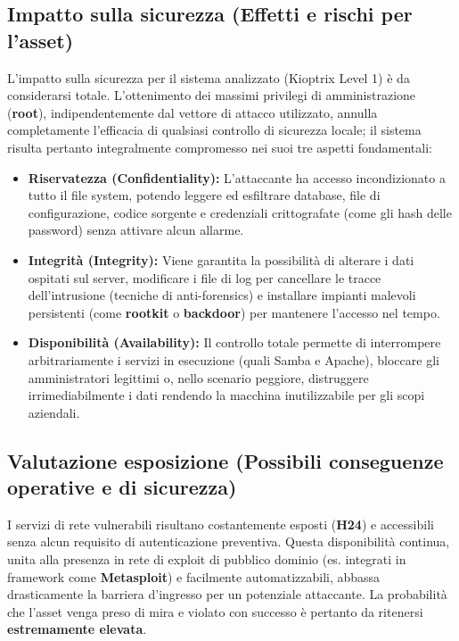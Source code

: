\documentclass[12pt, a4paper]{article}
\begin{document}
	\subsection{Impatto sulla sicurezza (Effetti e rischi per l'asset)}
	L'impatto sulla sicurezza per il sistema analizzato (Kioptrix Level 1) è da considerarsi totale. L'ottenimento dei massimi privilegi di amministrazione (\textbf{root}), indipendentemente dal vettore di attacco utilizzato, annulla completamente l'efficacia di qualsiasi controllo di sicurezza locale; il sistema risulta pertanto integralmente compromesso nei suoi tre aspetti fondamentali:
	\begin{itemize}
		\item \textbf{Riservatezza (Confidentiality):} L'attaccante ha accesso incondizionato a tutto il file system, potendo leggere ed esfiltrare database, file di configurazione, codice sorgente e credenziali crittografate (come gli hash delle password) senza attivare alcun allarme.
		\item \textbf{Integrità (Integrity):} Viene garantita la possibilità di alterare i dati ospitati sul server, modificare i file di log per cancellare le tracce dell'intrusione (tecniche di anti-forensics) e installare impianti malevoli persistenti (come \textbf{rootkit} o \textbf{backdoor}) per mantenere l'accesso nel tempo.
		\item \textbf{Disponibilità (Availability):} Il controllo totale permette di interrompere arbitrariamente i servizi in esecuzione (quali Samba e Apache), bloccare gli amministratori legittimi o, nello scenario peggiore, distruggere irrimediabilmente i dati rendendo la macchina inutilizzabile per gli scopi aziendali.
	\end{itemize}
	\vspace{0.5cm}
	\subsection{Valutazione esposizione (Possibili conseguenze operative e di sicurezza)}
	I servizi di rete vulnerabili risultano costantemente esposti (\textbf{H24}) e accessibili senza alcun requisito di autenticazione preventiva. Questa disponibilità continua, unita alla presenza in rete di exploit di pubblico dominio (es. integrati in framework come \textbf{Metasploit}) e facilmente automatizzabili, abbassa drasticamente la barriera d'ingresso per un potenziale attaccante. La probabilità che l'asset venga preso di mira e violato con successo è pertanto da ritenersi \textbf{estremamente elevata}.
\end{document}
